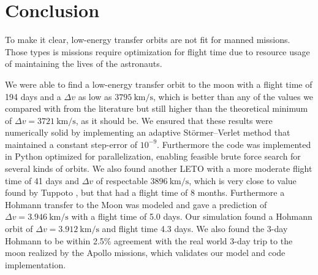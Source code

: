 \chapter{Conclusion}
To make it clear, low-energy transfer orbits are not fit for manned missions. Those types is missions require optimization for flight time due to resource usage of maintaining the lives of the astronauts.

We were able to find a low-energy transfer orbit to the moon with a flight time of 194 days and a $\Delta v$ as low as $\SI{3795}{\km\per\s}$, which is better than any of the values we compared with from the literature but still higher than the theoretical minimum of $\Delta v = \SI{3721}{\km\per\s}$, as it should be. We ensured that these results were numerically solid by implementing an adaptive Störmer–Verlet method that maintained a constant step-error of $10^{-9}$. Furthermore the code was implemented in Python optimized for parallelization, enabling feasible brute force search for several kinds of orbits. We also found another LETO with a more moderate flight time of 41 days and $\Delta v$ of respectable $\SI{3896}{\km\per\s}$, which is very close to value found by Tuppoto \cite{Topputo2005}, but that had a flight time of 8 months. Furthermore a Hohmann transfer to the Moon was modeled and gave a prediction of $\Delta v = \SI{3.946}{\km\per\s}$ with a flight time of 5.0 days. Our simulation found a Hohmann orbit of $\Delta v = \SI{3.912}{\km\per\s}$ and flight time 4.3 days. We also found the 3-day Hohmann to be within 2.5\% agreement with the real world 3-day trip to the moon realized by the Apollo missions, which validates our model and code implementation.